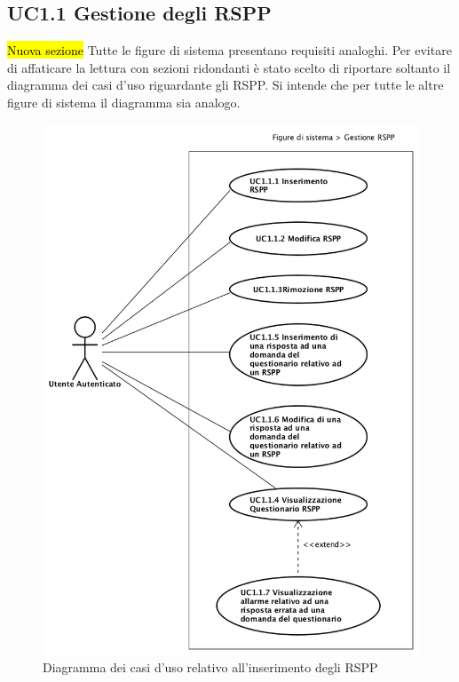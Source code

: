 	\subsection{UC1.1 Gestione degli RSPP}
	\label{section:UC1_1}
	\hl{Nuova sezione}
	Tutte le figure di sistema presentano requisiti analoghi. Per evitare di affaticare la lettura con sezioni ridondanti è stato scelto di riportare soltanto il diagramma dei casi d'uso riguardante gli RSPP. Si intende che per tutte le altre figure di sistema il diagramma sia analogo. 
		\begin{figure}[H]
			\begin{center}
				\includegraphics[width=12cm]{Pics/UC1_1_FigureDiSistema_RSPP.png}
				\caption{Diagramma dei casi d'uso relativo all'inserimento degli RSPP}
				\label{fig:UC1_1RSPP}
			\end{center}
		\end{figure}
